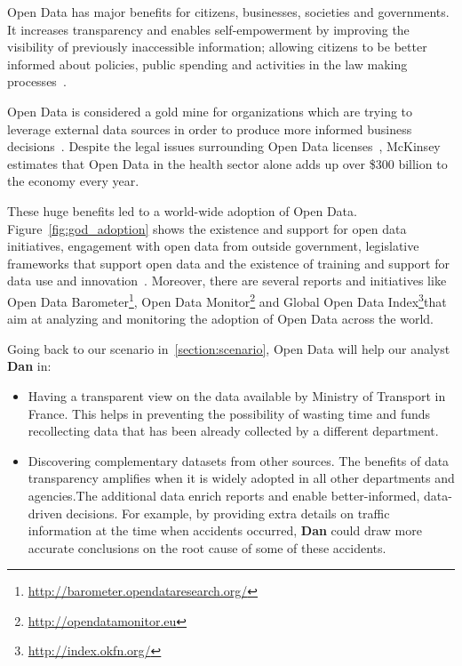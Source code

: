 Open Data has major benefits for citizens, businesses, societies and governments. It increases transparency and enables self-empowerment by improving the visibility of previously inaccessible information; allowing citizens to be better informed about policies, public spending and activities in the law making processes~\cite{Deloitte:Report:12, Manyika:Report:13}.

Open Data is considered a gold mine for organizations which are trying to leverage external data sources in order to produce more informed business decisions~\cite{Boyd:Article:11}. Despite the legal issues surrounding Open Data licenses~\cite{Prateek:Misc:13}, McKinsey~\cite{Manyika:Report:13} estimates that Open Data in the health sector alone adds up over \$300 billion to the economy every year.

These huge benefits led to a world-wide adoption of Open Data. Figure~\ref{fig:god_adoption} shows the existence and support for open data initiatives, engagement with open data from outside government, legislative frameworks that support open data and the existence of training and support for data use and innovation~\cite{Davies:Report:15}.
Moreover, there are several reports and initiatives like Open Data Barometer\footnote{\url{http://barometer.opendataresearch.org/}}, Open Data Monitor\footnote{\url{http://opendatamonitor.eu}} and Global Open Data Index\footnote{\url{http://index.okfn.org/}}that aim at analyzing and monitoring the adoption of Open Data across the world.

Going back to our scenario in~\ref{section:scenario}, Open Data will help our analyst \textbf{Dan} in:

\begin{itemize}
	\item Having a transparent view on the data available by Ministry of Transport in France. This helps in preventing the possibility of wasting time and funds recollecting data that has been already collected by a different department.
	\item Discovering complementary datasets from other sources. The benefits of data transparency amplifies when it is widely adopted in all other departments and agencies.The additional data enrich reports and enable better-informed, data-driven decisions. For example, by providing extra details on traffic information at the time when accidents occurred, \textbf{Dan} could draw more accurate conclusions on the root cause of some of these accidents.
\end{itemize}

